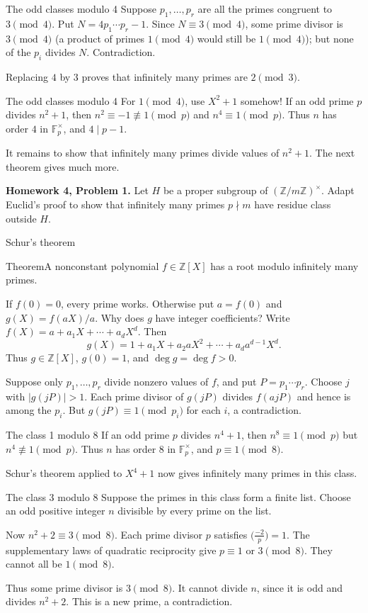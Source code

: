 \documentclass[aspectratio=169,11pt]{beamer}
\newcommand{\Z}{\mathbb Z}
\newcommand{\F}{\mathbb F}
\newcommand{\HW}[2]{{\color{teal}\textbf{Homework #1, Problem #2.}}}
\begin{document}
\begin{frame}{The odd classes modulo 4}
Suppose $p_1,\ldots,p_r$ are all the primes congruent to $3\pmod4$. Put $N=4p_1\cdots p_r-1$. Since $N\equiv3\pmod4$, some prime divisor is $3\pmod4$ (a product of primes $1\pmod4$ would still be $1\pmod4$); but none of the $p_i$ divides $N$. Contradiction.

Replacing $4$ by $3$ proves that infinitely many primes are $2\pmod3$.
\end{frame}
\begin{frame}{The odd classes modulo 4}
For $1\pmod4$, use $X^2+1$ somehow! If an odd prime $p$ divides $n^2+1$, then $n^2\equiv-1\not\equiv1\pmod p$ and $n^4\equiv1\pmod p$. Thus $n$ has order $4$ in $\F_p^\times$, and $4\mid p-1$.

It remains to show that infinitely many primes divide values of $n^2+1$. The next theorem gives much more.

\HW{4}{1} Let $H$ be a proper subgroup of $(\Z/m\Z)^\times$. Adapt Euclid's proof to show that infinitely many primes $p\nmid m$ have residue class outside $H$.
\end{frame}
\begin{frame}{Schur's theorem}
\begin{block}{Theorem}A nonconstant polynomial $f\in\Z[X]$ has a root modulo infinitely many primes.\end{block}
If $f(0)=0$, every prime works. Otherwise put $a=f(0)$ and $g(X)=f(aX)/a$. Why does $g$ have integer coefficients? Write $f(X)=a+a_1X+\cdots+a_dX^d$. Then
\[g(X)=1+a_1X+a_2aX^2+\cdots+a_da^{d-1}X^d.\]
Thus $g\in\Z[X]$, $g(0)=1$, and $\deg g=\deg f>0$.

Suppose only $p_1,\ldots,p_r$ divide nonzero values of $f$, and put $P=p_1\cdots p_r$. Choose $j$ with $|g(jP)|>1$. Each prime divisor of $g(jP)$ divides $f(ajP)$ and hence is among the $p_i$. But $g(jP)\equiv1\pmod {p_i}$ for each $i$, a contradiction.
\end{frame}
\begin{frame}{The class 1 modulo 8}
If an odd prime $p$ divides $n^4+1$, then $n^8\equiv1\pmod p$ but $n^4\not\equiv1\pmod p$. Thus $n$ has order $8$ in $\F_p^\times$, and $p\equiv1\pmod8$.

Schur's theorem applied to $X^4+1$ now gives infinitely many primes in this class.
\end{frame}
\begin{frame}{The class 3 modulo 8}
Suppose the primes in this class form a finite list. Choose an odd positive integer $n$ divisible by every prime on the list.

Now $n^2+2\equiv3\pmod8$. Each prime divisor $p$ satisfies $\bigl(\frac{-2}{p}\bigr)=1$. The supplementary laws of quadratic reciprocity give $p\equiv1$ or $3\pmod8$. They cannot all be $1\pmod8$.

Thus some prime divisor is $3\pmod8$. It cannot divide $n$, since it is odd and divides $n^2+2$. This is a new prime, a contradiction.
\end{frame}
\end{document}
